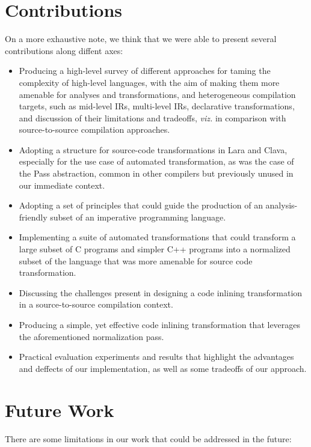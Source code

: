 \section{Contributions}

On a more exhaustive note, we think that we were able to present several contributions along diffent axes:

\begin{itemize}
    \item Producing a high-level survey of different approaches for taming the complexity of high-level languages, with the aim of making them more amenable for analyses and transformations, and heterogeneous compilation targets, such as mid-level IRs, multi-level IRs, declarative transformations, and discussion of their limitations and tradeoffs, \textit{viz.} in comparison with source-to-source compilation approaches.
    \item Adopting a structure for source-code transformations in Lara and Clava, especially for the use case of automated transformation, as was the case of the Pass abstraction, common in other compilers but previously unused in our immediate context.
    \item Adopting a set of principles that could guide the production of an analysis-friendly subset of an imperative programming language.
    \item Implementing a suite of automated transformations that could transform a large subset of C programs and simpler C++ programs into a normalized subset of the language that was more amenable for source code transformation.
    \item Discussing the challenges present in designing a code inlining transformation in a source-to-source compilation context.
    \item Producing a simple, yet effective code inlining transformation that leverages the aforementioned normalization pass.
    \item Practical evaluation experiments and results that highlight the advantages and deffects of our implementation, as well as some tradeoffs of our approach.
\end{itemize}

\section{Future Work}

There are some limitations in our work that could be addressed in the future:


